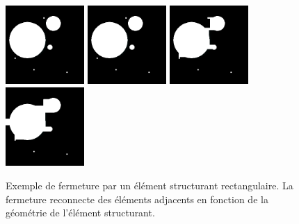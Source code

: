   \begin{figure}[h]
    \centering
    \includegraphics[height=3cm]{Images/morpho_init.png}
    \includegraphics[height=3cm]{Images/morpho_close_k5.png}
    \includegraphics[height=3cm]{Images/morpho_close_k21.png}
    \includegraphics[height=3cm]{Images/morpho_close_k31.png}
    \caption{Exemple de fermeture par un élément structurant rectangulaire. La fermeture reconnecte des éléments adjacents en fonction de la géométrie de l'élément structurant.}
    \label{fig:morpho_femerture}
  \end{figure}
  
